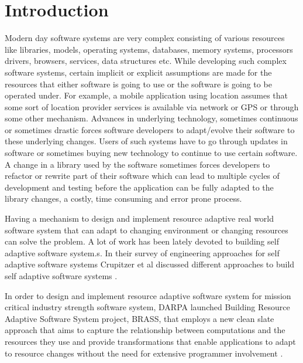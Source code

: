 \section{Introduction}

Modern day software systems are very complex consisting of various resources like libraries, models, operating systems, databases, memory systems, processors drivers, browsers, services, data structures etc. While developing such complex software systems, certain implicit or explicit assumptions are made for the resources that either software is going to use or the software is going to be operated under. For example, a mobile application using location assumes that some sort of location provider services is available via network or GPS or through some other mechanism. Advances in underlying technology, sometimes continuous or sometimes drastic forces software developers to adapt/evolve their software to these underlying changes. Users of such systems have to go through updates in software or sometimes buying new technology to continue to use certain software. A change in a library used by the software sometimes forces developers to refactor or rewrite part of their software which can lead to multiple cycles of development and testing before the application can be fully adapted to the library changes, a costly, time consuming and error prone process.  

Having a mechanism to design and implement resource adaptive real world software system that can adapt to changing environment or changing resources can solve the problem. A lot of work has been lately devoted to building self adaptive software system.s. In their survey of engineering approaches for self adaptive software systems Crupitzer et al discussed different approaches to build self adaptive software systems \cite{selfAdaptation2}.     

In order to design and implement resource adaptive software system for mission critical industry strength software system, DARPA launched Building Resource Adaptive Software System project, BRASS, that employs a new clean slate approach that aims to capture the relationship between computations and the resources they use and provide transformations that enable applications to adapt to resource changes without the need for extensive programmer involvement \cite{darpa1}. 

